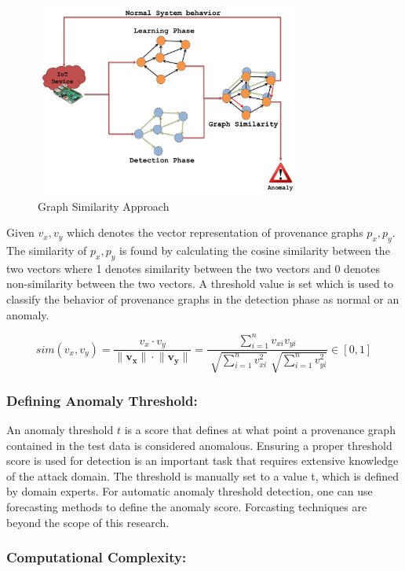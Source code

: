 \begin{figure}[h!]
\begin{center}
\includegraphics[height=2.5in, width=3.5in]{similarity_5.png}
\end{center}
\caption{Graph Similarity Approach}
\label{graph_similarity}
\end{figure}

Given $v_x, v_y$ which denotes the vector representation of provenance graphs $p_x, p_y$. The similarity of $p_x, p_y$ is found by calculating the cosine similarity between the two vectors where 1 denotes similarity between the two vectors and 0 denotes non-similarity between the two vectors. A threshold value is set which is used to classify the behavior of provenance graphs in the detection phase as normal or an anomaly.

\[sim(v_x,v_y) =  \dfrac{v_x \cdot  v_y}{ \lVert \mathbf{v_x} \rVert \cdot \lVert \mathbf{v_y} \rVert} =\dfrac{\sum_{i=1}^n v_{xi} v_{yi} }{\sqrt[]{\sum_{i=1}^n v_{xi}^2} \sqrt[]{\sum_{i=1}^n v_{yi}^2}}  \in [0,1] \]




\subsubsection{Defining Anomaly Threshold:}

An anomaly threshold $t$ is a score that defines at what point a provenance graph contained in the test data is considered anomalous. Ensuring a proper threshold score is used for detection is an important task that requires extensive knowledge of the attack domain. The threshold is manually set to a value t, which is defined by domain experts. For automatic anomaly threshold detection, one can use forecasting methods to define the anomaly score. Forcasting techniques are beyond the scope of this research. 

\subsubsection{Computational Complexity:}

